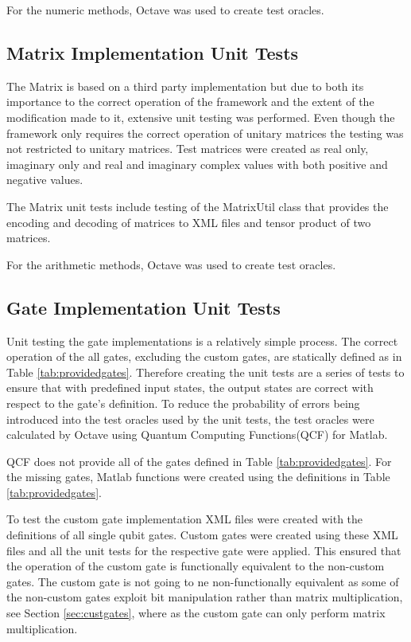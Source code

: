 For the numeric methods, Octave\cite{octweb} was used to create test oracles.

\subsection{Matrix Implementation Unit Tests}
The Matrix is based on a third party implementation but due to both its importance to the correct operation of the framework and the extent of the modification made to it, extensive unit testing was performed.
Even though the framework only requires the correct operation of unitary matrices the testing was not restricted to unitary matrices.
Test matrices were created as real only,  imaginary only and real and imaginary complex values with both positive and negative values.

The Matrix unit tests include testing of the MatrixUtil class that provides the encoding and decoding of matrices to XML files and tensor product of two matrices.

For the arithmetic methods, Octave\cite{octweb} was used to create test oracles.

\subsection{Gate Implementation Unit Tests}
\label{sec:gatetests}
Unit testing the gate implementations is a relatively simple process.
The correct operation of the all gates, excluding the custom gates, are statically defined as in Table \ref{tab:providedgates}.
Therefore creating the unit tests are a series of tests to ensure that with predefined input states, the output states are correct with respect to the gate's definition.
To reduce the probability of errors being introduced into the test oracles used by the unit tests, the test oracles were calculated by Octave\cite{octweb} using Quantum Computing Functions(QCF) for Matlab\cite{qcfweb}.

QCF does not provide all of the gates defined in Table \ref{tab:providedgates}.
For the missing gates, Matlab functions were created using the definitions in Table \ref{tab:providedgates}.

To test the custom gate implementation XML files were created with the definitions of all single qubit gates.
Custom gates were created using these XML files and all the unit tests for the respective gate were applied.
This ensured that the operation of the custom gate is functionally equivalent to the non-custom gates.
The custom gate is not going to ne non-functionally equivalent as some of the non-custom gates exploit bit manipulation rather than matrix multiplication, see Section \ref{sec:custgates}, where as the custom gate can only perform matrix multiplication.

